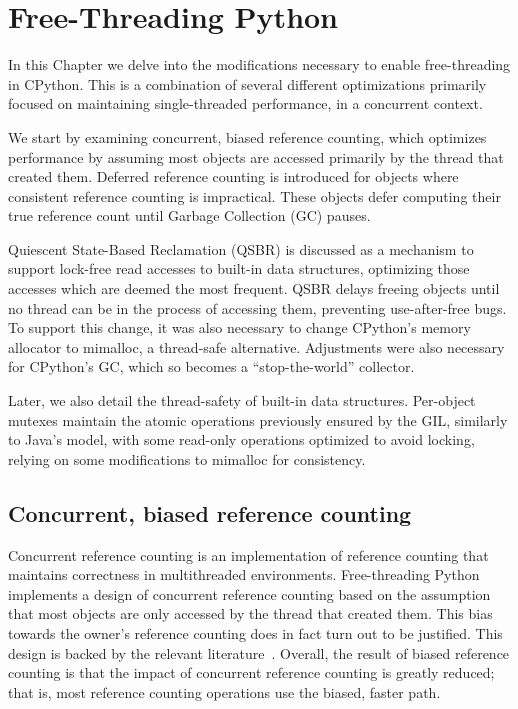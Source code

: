 \chapter{Free-Threading Python}\label{ch:free-threading-python}

In this Chapter we delve into the modifications necessary to enable free-threading in CPython.
This is a combination of several different optimizations primarily focused on maintaining single-threaded performance, in a concurrent context.

We start by examining concurrent, biased reference counting, which optimizes performance by assuming most objects are accessed primarily by the thread that created them.
Deferred reference counting is introduced for objects where consistent reference counting is impractical.
These objects defer computing their true reference count until Garbage Collection (GC) pauses.

Quiescent State-Based Reclamation (QSBR) is discussed as a mechanism to support lock-free read accesses to built-in data structures, optimizing those accesses which are deemed the most frequent.
QSBR delays freeing objects until no thread can be in the process of accessing them, preventing use-after-free bugs.
To support this change, it was also necessary to change CPython's memory allocator to mimalloc, a thread-safe alternative.
Adjustments were also necessary for CPython's GC, which so becomes a ``stop-the-world'' collector.

Later, we also detail the thread-safety of built-in data structures.
Per-object mutexes maintain the atomic operations previously ensured by the GIL, similarly to Java's model, with some read-only operations optimized to avoid locking, relying on some modifications to mimalloc for consistency.


\section{Concurrent, biased reference counting}\label{sec:concurrent-biased-reference-counting}

Concurrent reference counting is an implementation of reference counting that maintains correctness in multithreaded environments.
Free-threading Python implements a design of concurrent reference counting based on the assumption that most objects are only accessed by the thread that created them.
This bias towards the owner's reference counting does in fact turn out to be justified.
This design is backed by the relevant literature~\cite{biased-refcounting}.
Overall, the result of biased reference counting is that the impact of concurrent reference counting is greatly reduced; that is, most reference counting operations use the biased, faster path.

